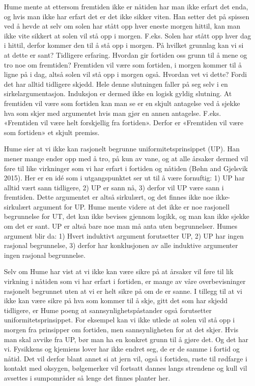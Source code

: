 \documentclass[
  letterpaper,
  DIV=11,
  numbers=noendperiod]{scrreprt}
\begin{document}
Hume mente at ettersom fremtiden ikke er nåtiden har man ikke erfart det
enda, og hvis man ikke har erfart det er det ikke sikker viten. Han
setter det på spissen ved å hevde at selv om solen har stått opp hver
eneste morgen hittil, kan man ikke vite sikkert at solen vil stå opp i
morgen. F.eks. Solen har stått opp hver dag i hittil, derfor kommer den
til å stå opp i morgen. På hvilket grunnlag kan vi si at dette er sant?
Tidligere erfaring. Hvordan gir fortiden oss grunn til å mene og tro noe
om fremtiden? Fremtiden vil være som fortiden, i morgen kommer til å
ligne på i dag, altså solen vil stå opp i morgen også. Hvordan vet vi
dette? Fordi det har alltid tidligere skjedd. Hele denne slutningen
faller på seg selv i en sirkelargumentasjon. Induksjon er dermed ikke en
logisk gyldig slutning. At fremtiden vil være som fortiden kan man se er
en skjult antagelse ved å sjekke hva som skjer med argumentet hvis man
gjør en annen antagelse. F.eks. «Fremtiden vil være helt forskjellig fra
fortiden». Derfor er «Fremtiden vil være som fortiden» et skjult
premiss.

Hume sier at vi ikke kan rasjonelt begrunne uniformitetsprinsippet (UP).
Han mener mange ender opp med å tro, på kun av vane, og at alle årsaker
dermed vil føre til like virkninger som vi har erfart i fortiden og
nåtiden (Bøhn and Gjelsvik 2015). Her er en idé som i utgangspunktet ser
ut til å være fornuftig: 1) UP har alltid vært sann tidligere, 2) UP er
sann nå, 3) derfor vil UP være sann i fremtiden. Dette argumentet er
altså sirkulært, og det finnes ikke noe ikke-sirkulært argument for UP.
Hume mente videre at det ikke er noe rasjonell begrunnelse for UT, det
kan ikke bevises gjennom logikk, og man kan ikke sjekke om det er sant.
UP er altså bare noe man må anta uten begrunnelser. Humes argument blir
da: 1) Hvert induktivt argument forutsetter UP, 2) UP har ingen rasjonal
begrunnelse, 3) derfor har konklusjonen av alle induktive argumenter
ingen rasjonal begrunnelse.

Selv om Hume har vist at vi ikke kan være sikre på at årsaker vil føre
til lik virkning i nåtiden som vi har erfart i fortiden, er mange av
våre overbevisninger rasjonelt begrunnet uten at vi er helt sikre på om
de er sanne. I tillegg til at vi ikke kan være sikre på hva som kommer
til å skje, gitt det som har skjedd tidligere, er Hume poeng at
sannsynlighetspåstander også forutsetter uniformitetsprinsippet. For
eksempel kan vi ikke utlede at solen vil stå opp i morgen fra prinsipper
om fortiden, men sannsynligheten for at det skjer. Hvis man skal avvike
fra UP, bør man ha en konkret grunn til å gjøre det. Og det har vi.
Fysikkens og kjemiens lover har ikke endret seg, de er de samme i fortid
og nåtid. Det vil derfor blant annet si at jern vil, også i fortiden,
ruste til rødfarge i kontakt med oksygen, bølgemerker vil fortsatt
dannes langs strendene og kull vil avsettes i sumpområder så lenge det
finnes planter her.
\end{document}

